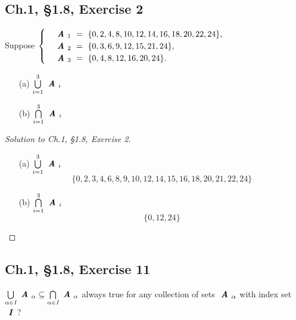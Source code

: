 \documentclass[12pt]{amsart}
\numberwithin{equation}{section}
\theoremstyle{definition}
\theoremstyle{remark}
\begin{document}

\subsection*{Ch.1, \S 1.8,  Exercise 2} Suppose
$
\begin{cases}
      & \textbf{ \textit{A} }_1 \ = \ \{ 0, 2, 4, 8, 10, 12, 14, 16, 18, 20, 22, 24 \}, \\
      & \textbf{ \textit{A} }_2 \ = \ \{ 0, 3, 6, 9, 12, 15, 21, 24 \}, \\
      & \textbf{ \textit{A} }_3 \ = \ \{ 0, 4, 8, 12, 16, 20, 24 \}.
\end{cases}
$

\begin{enumerate}
\item[(a)]
$ \bigcup\limits_{ i = 1 }^{ 3 } \textbf{ \textit{A} }_{ i } $
\item[(b)]
$ \bigcap\limits_{ i = 1 }^{ 3 } \textbf{ \textit{A} }_{ i } $

\end{enumerate}

\begin{proof}[Solution to Ch.1, \S 1.8,  Exercise 2] \ \\

\begin{enumerate}
\item[(a)]
$ \bigcup\limits_{ i = 1 }^{ 3 } \textbf{ \textit{A} }_{ i } $
$$
\{ 0, 2, 3, 4, 6, 8, 9, 10, 12, 14, 15, 16, 18, 20, 21, 22, 24 \}
$$

\item[(b)]
$ \bigcap\limits_{ i = 1 }^{ 3 } \textbf{ \textit{A} }_{ i } $
$$
\{ 0, 12, 24 \}
$$

\end{enumerate}

\end{proof}



\subsection*{Ch.1, \S 1.8,  Exercise 11} $ \bigcup\limits_{ \alpha \in \textit{I} } \textbf{ \textit{A} }_{ \alpha } \subseteq \bigcap\limits_{ \alpha \in \textit{I} } \textbf{ \textit{A} }_{ \alpha } $ always true for any collection of sets $ \textbf{ \textit{A} }_{ \alpha } $ with index set $ \textbf{ \textit{I} } $?
\end{document}
